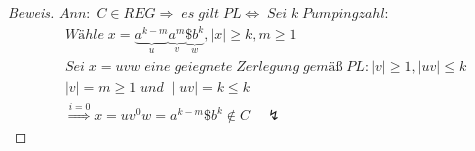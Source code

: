 \begin{proof}[Beweis]
	\begin{math}
		Ann:\;C\in REG\Rightarrow\;es\;gilt\;PL\Leftrightarrow\;Sei\;k\;Pumpingzahl:
	\end{math}
	\begin{align*}
		&Wähle\;x=\underbrace{a^{k-m}}_u\underbrace{a^m}_v\underbrace{\$b^k}_w,\mid x\mid\ge k,m\ge1\\
		&Sei\;x=uvw\;eine\;geiegnete\;Zerlegung\;gemäß\;PL:\mid v\mid\ge1,\mid uv\mid\le k\\
		&\mid v\mid=m\ge1\;und\;\mid uv\mid=k\le k\\
			&\overset{i=0}{\Longrightarrow}x=uv^0w=a^{k-m}\$b^k\notin C\quad\lightning
	\end{align*}
\end{proof}